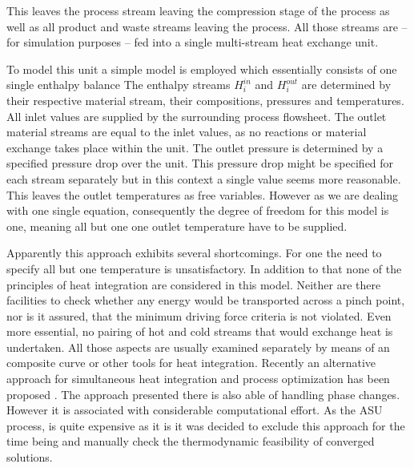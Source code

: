     This leaves the process stream leaving the compression stage of the process as well as all product and waste streams
    leaving the process. All those streams are -- for simulation purposes -- fed into a single multi-stream heat exchange
    unit. 
    
    
    
    To model this unit a simple model is employed which essentially consists of one single enthalpy balance
    The enthalpy streams $H_i^{in}$ and $H_i^{out}$ are determined by their respective material stream, their compositions,
    pressures and temperatures. All inlet values are supplied by the surrounding process flowsheet. The outlet material streams
    are equal to the inlet values, as no reactions or material exchange takes place within the unit. The outlet pressure
    is determined by a specified pressure drop over the unit. This pressure drop might be specified for each stream separately
    but in this context a single value seems more reasonable. This leaves the outlet temperatures as free variables. However
    as we are dealing with one single equation, consequently the degree of freedom for this model is one, meaning all but one
    one outlet temperature have to be supplied.

    Apparently this approach exhibits several shortcomings. For one the need to specify all but one temperature is
    unsatisfactory. In addition to that none of the principles of heat integration are considered in this model.
    Neither are there facilities to check whether any energy would be transported across a pinch point, nor is
    it assured, that the minimum driving force criteria is not violated. Even more essential, no pairing of
    hot and cold streams that would exchange heat is undertaken. All those aspects are usually examined separately
    by means of an composite curve or other tools for heat integration. Recently an alternative approach for
    simultaneous heat integration and process optimization has been proposed \cite{Kamath.2012}. The approach
    presented there is also able of handling phase changes. However it is associated with considerable computational
    effort. As the ASU process, is quite expensive as it is it was decided to exclude this approach for the time being
    and manually check the thermodynamic feasibility of converged solutions.


